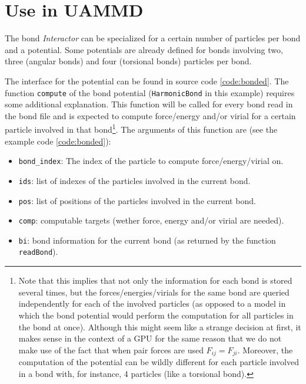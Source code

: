 \documentclass[twoside,openright,titlepage,numbers=noenddot,%
headinclude,footinclude,cleardoublepage=empty,abstract=on,
BCOR=5mm,fontsize=11pt, dvipsnames, paper=b5
]{scrreprt}
\def\ucpp{uammd_cpp_lexer.py:UAMMDCppLexer -x}
\begin{document}
\section*{Use in UAMMD}
The bond \emph{Interactor} can be specialized for a certain number of particles per bond and a potential. Some potentials are already defined for bonds involving two, three (angular bonds) and four (torsional bonds) particles per bond.

The interface for the potential can be found in source code \ref{code:bonded}. The function \texttt{compute} of the bond potential (\texttt{HarmonicBond} in this example) requires some additional explanation. This function will be called for every bond read in the bond file and is expected to compute force/energy and/or virial for a certain particle involved in that bond\footnote{Note that this implies that not only the information for each bond is stored several times, but the forces/energies/virials for the same bond are queried independently for each of the involved particles (as opposed to a model in which the bond potential would perform the computation for all particles in the bond at once). Although this might seem like a strange decision at first, it makes sense in the context of a GPU for the same reason that we do not make use of the fact that when pair forces are used $F_{ij} = F_{ji}$. Moreover, the computation of the potential can be wildly different for each particle involved in a bond with, for instance, 4 particles (like a torsional bond).}. The arguments of this function are (see the example code \ref{code:bonded}):
\begin{itemize}
\item \texttt{bond_index}: The index of the particle to compute force/energy/virial on.
\item \texttt{ids}: list of indexes of the particles involved in the current bond.
\item \texttt{pos}: list of positions of the particles involved in the current bond.
\item \texttt{comp}: computable targets (wether force, energy and/or virial are needed).
\item \texttt{bi}: bond information for the current bond (as returned by the function \texttt{readBond}).
\end{itemize}
\end{document}
